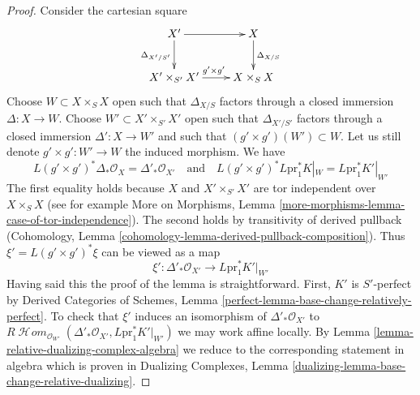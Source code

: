 \documentclass[10pt,a4paper]{amsart}
\theoremstyle{plain}
\theoremstyle{definition}
\theoremstyle{remark}
\numberwithin{equation}{subsection}
\def\SheafHom{\mathop{\mathcal{H}\!\mathit{om}}\nolimits}
\begin{document}
\begin{proof}
Consider the cartesian square
$$
\xymatrix{
X' \ar[d]_{\Delta_{X'/S'}} \ar[r] & X \ar[d]^{\Delta_{X/S}} \\
X' \times_{S'} X' \ar[r]^{g' \times g'} & X \times_S X
}
$$
Choose $W \subset X \times_S X$ open such that $\Delta_{X/S}$
factors through a closed immersion $\Delta : X \to W$.
Choose $W' \subset X' \times_{S'} X'$ open such that $\Delta_{X'/S'}$
factors through a closed immersion $\Delta' : X \to W'$
and such that $(g' \times g')(W') \subset W$. Let us still denote
$g' \times g' : W' \to W$ the induced morphism. We have
$$
L(g' \times g')^*\Delta_*\mathcal{O}_X =
\Delta'_*\mathcal{O}_{X'}
\quad\text{and}\quad
L(g' \times g')^*L\text{pr}_1^*K|_W =
L\text{pr}_1^*K'|_{W'}
$$
The first equality holds because $X$ and $X' \times_{S'} X'$
are tor independent over $X \times_S X$ (see for example
More on Morphisms, Lemma \ref{more-morphisms-lemma-case-of-tor-independence}).
The second holds by transitivity of derived pullback
(Cohomology, Lemma \ref{cohomology-lemma-derived-pullback-composition}).
Thus $\xi' = L(g' \times g')^*\xi$ can be viewed as a map
$$
\xi' : \Delta'_*\mathcal{O}_{X'} \longrightarrow L\text{pr}_1^*K'|_{W'}
$$
Having said this the proof of the lemma is straightforward.
First, $K'$ is $S'$-perfect by Derived Categories of Schemes, Lemma
\ref{perfect-lemma-base-change-relatively-perfect}.
To check that $\xi'$ induces an isomorphism
of $\Delta'_*\mathcal{O}_{X'}$ to
$R\SheafHom_{\mathcal{O}_{W'}}(
\Delta'_*\mathcal{O}_{X'}, L\text{pr}_1^*K'|_{W'})$
we may work affine locally. By
Lemma \ref{lemma-relative-dualizing-complex-algebra}
we reduce to the corresponding statement in algebra
which is proven in Dualizing Complexes, Lemma
\ref{dualizing-lemma-base-change-relative-dualizing}.
\end{proof}
\end{document}
